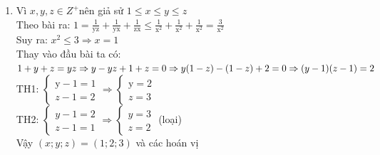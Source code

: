 \begin{bt}
{\begin{enumerate}
            Từ đó $\mathrm{HS}$ biến đổi và tính được: $\mathrm{a}=-3 ; \mathrm{b}=-1$
            \item Vì $x, y, z \in Z^{+}$nên giả sử $1 \leq x \leq y \leq z$\\[5px]
            Theo bài ra: $1=\frac{1}{\mathrm{yz}}+\frac{1}{\mathrm{yx}}+\frac{1}{\mathrm{zx}} \leq \frac{1}{\mathrm{x}^2}+\frac{1}{\mathrm{x}^2}+\frac{1}{\mathrm{x}^2}=\frac{3}{\mathrm{x}^2}$\\[5px]
            Suy ra: $x^2 \leq 3 \Rightarrow x=1$\\[5px]
            Thay vào đầu bài ta có:\\[5px]
            $1+y+z=y z \Rightarrow y-y z+1+z=0 \\[5px]
            \Rightarrow y(1-z)-(1-z)+2=0 \\[5px]
            \Rightarrow(y-1)(z-1)=2$\\[5px]
            TH1: $\left\{\begin{array}{l}\mathrm{y}-1=1 \\[5px] z-1=2\end{array} \Rightarrow\left\{\begin{array}{l}\mathrm{y}=2 \\[5px] z=3\end{array}\right.\right.$\\[5px]
            TH2: $\left\{\begin{array}{l}y-1=2 \\[5px] z-1=1\end{array} \Rightarrow\left\{\begin{array}{l}y=3 \\[5px] z=2\end{array}\right.\right.$ (loại)\\[5px]
            Vậy $(x ; y ; z)=(1 ; 2 ; 3)$ và các hoán vị
        \end{enumerate}
    } 
\end{bt}

